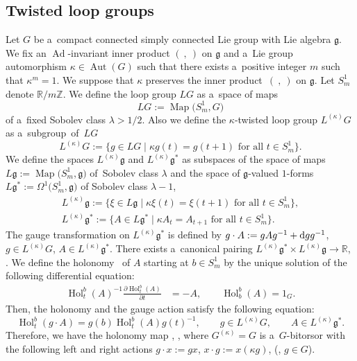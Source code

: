 \documentclass[10pt,a4paper]{amsart}
\numberwithin{equation}{section}
\theoremstyle{definition}
\newcommand{\Map}{\operatorname{Map}}
\newcommand{\Ad}{\operatorname{Ad}}
\newcommand{\Aut}{\operatorname{Aut}}
\newcommand{\Hol}{\operatorname{Hol}}
\newcommand{\bR}{\mathbb{R}}
\newcommand{\bZ}{\mathbb{Z}}
\begin{document}
\subsection{Twisted loop groups}\label{Twisted loop groups}
Let $G$ be a~compact connected simply connected Lie group
with Lie algebra $\mathfrak{g}$. We fix an $\Ad$-invariant inner product $(\ ,\ )$ on $\mathfrak{g}$
and a~Lie group automorphism $\kappa \in \Aut(G)$ such that there exists a~positive integer $m$ such that $\kappa^m=1$.
We suppose that $\kappa$ preserves the inner product~$(\ ,\ )$ on $\mathfrak{g}$.
Let $S^{1}_m$ denote $\bR/ m \bZ$.
We define the loop group $LG$ as a~space of maps
\[LG := \Map\bigl(S^1_m,G\bigr)\]
of a~fixed Sobolev class $\lambda > 1/2$.
Also we define the $\kappa$-twisted loop group $L^{(\kappa)}G$ as a~subgroup~of~$LG$
\[L^{(\kappa)}G := \bigl\{g \in LG \mid \kappa g (t) = g(t+1) \text{ for all } t \in S^1_m\bigr\}.\]
We define the spaces $L^{(\kappa)}\mathfrak{g}$ and $L^{(\kappa)}\mathfrak{g}^*$ as subspaces of the space of maps $L\mathfrak{g}:= \Map\bigl(S^1_m, \mathfrak{g}\bigr)$ of~Sobolev class $\lambda$ and the space of $\mathfrak{g}$-valued $1$-forms $L\mathfrak{g}^* := \Omega^1\bigl(S^1_m,\mathfrak{g}\bigr)$ of Sobolev class $\lambda-1$,
\begin{gather*}
 L^{(\kappa)}\mathfrak{g} := \bigl\{\xi \in L\mathfrak{g}\mid \kappa \xi (t) = \xi (t+1) \text{ for all }t \in S^1_m \bigr\}, \\
 L^{(\kappa)}\mathfrak{g}^{*} := \bigl\{A \in L\mathfrak{g}^*\mid \kappa A_t = A_{t+1} \text{ for all }t \in S^1_m\bigr\}.
\end{gather*}
The gauge transformation on $L^{(\kappa)}\mathfrak{g}^*$ is defined by $g \cdot A := gAg^{-1} + {\rm d}gg^{-1}$, $ g \in L^{(\kappa)}G$, $ A \in L^{(\kappa)}\mathfrak{g}^*$.
There exists a~canonical pairing $L^{(\kappa)}\mathfrak{g}^* \times L^{(\kappa)}\mathfrak{g} \to \bR$, .
We define the holonomy~\smash{$\Hol^{b}_t(A)$} of $A$ starting at $b \in S^{1}_m$ by the unique solution of the following differential equation:
\begin{align*}
 \Hol^{b}_t(A)^{-1} \frac{\partial \Hol^{b}_t(A)}{\partial t} &= -A,\qquad
 \Hol^{b}_b(A) = 1_G.
\end{align*}
Then, the holonomy and the gauge action satisfy the following equation:
\[
\Hol^{b}_t(g\cdot A) = g(b) \Hol ^{b}_t(A) g(t)^{-1}, \qquad g \in L^{(\kappa)}G,\qquad A \in L^{(\kappa)}\mathfrak{g}^*.
\]
Therefore, we have the holonomy map \smash{$\Hol^{(\kappa)} \colon L^{(\kappa)}\mathfrak{g}^{*} \to G^{(\kappa)}$}, \smash{$ A \mapsto \Hol^{0}_1(A)$},
where $G^{(\kappa)} = G$ is a~$G$-bitorsor with the following left and right actions
$g\cdot x := gx$, $x \cdot g := x (\kappa g)$, \big(, $ g \in G$\big).
\end{document}
